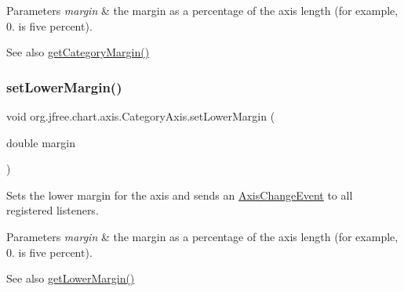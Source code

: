 \begin{DoxyParams}{Parameters}
{\em margin} & the margin as a percentage of the axis length (for example, 0. is five percent).\\
\hline
\end{DoxyParams}
\begin{DoxySeeAlso}{See also}
\mbox{\hyperlink{classorg_1_1jfree_1_1chart_1_1axis_1_1_category_axis_a7f3b48c2323a993c49433577000f4daa}{get\+Category\+Margin()}} 
\end{DoxySeeAlso}
\mbox{\label{classorg_1_1jfree_1_1chart_1_1axis_1_1_category_axis_a88698d2061063cb5172c363be686b115}} 
\subsubsection{\texorpdfstring{set\+Lower\+Margin()}{setLowerMargin()}}
{\footnotesize\ttfamily void org.\+jfree.\+chart.\+axis.\+Category\+Axis.\+set\+Lower\+Margin (\begin{DoxyParamCaption}\item[{double}]{margin }\end{DoxyParamCaption})}

Sets the lower margin for the axis and sends an \mbox{\hyperlink{}{Axis\+Change\+Event}} to all registered listeners.


\begin{DoxyParams}{Parameters}
{\em margin} & the margin as a percentage of the axis length (for example, 0. is five percent).\\
\hline
\end{DoxyParams}
\begin{DoxySeeAlso}{See also}
\mbox{\hyperlink{classorg_1_1jfree_1_1chart_1_1axis_1_1_category_axis_aa43dece7ed3eeb9179b874befee56d0f}{get\+Lower\+Margin()}} 
\end{DoxySeeAlso}
\mbox{\label{classorg_1_1jfree_1_1chart_1_1axis_1_1_category_axis_a04818cb638781c835730b6d0fc64f468}} 
